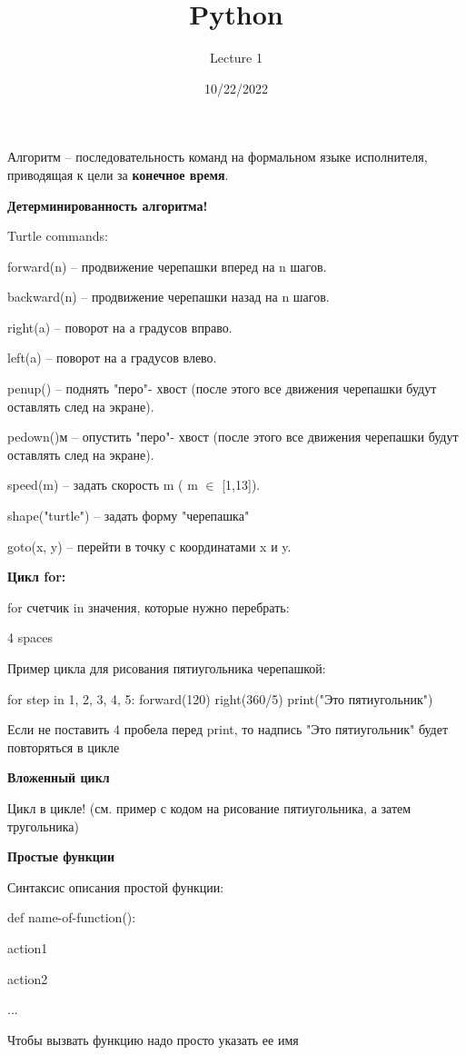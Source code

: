 \documentclass[a4paper,12pt]{article}
\author{Lecture 1}
\title{Python}
\date{10/22/2022}
\begin{document}

\maketitle
Алгоритм -- последовательность команд на формальном языке исполнителя, приводящая к цели за \textbf{конечное время}. 

\textbf{Детерминированность алгоритма!}

Turtle commands:

forward(n) -- продвижение черепашки вперед на n шагов.

backward(n) -- продвижение черепашки назад на n шагов.

right(a) -- поворот на а градусов вправо.

left(a) -- поворот на а градусов влево.

penup() -- поднять "перо"- хвост (после этого все движения черепашки будут оставлять след на экране).

pedown()м -- опустить "перо"- хвост (после этого все движения черепашки будут оставлять след на экране).

speed(m) -- задать скорость m ( m $\in$ [1,13]).

shape("turtle") -- задать форму "черепашка"

goto(x, y) --  перейти в точку с координатами x и y.

\textbf{Цикл for:}

for счетчик in значения, которые нужно перебрать:

4 spaces

Пример цикла для рисования пятиугольника черепашкой:

for step in 1, 2, 3, 4, 5:
    forward(120)
    right(360/5)
print("Это пятиугольник")

Если не поставить 4 пробела перед print, то надпись "Это пятиугольник" будет повторяться в цикле

\textbf{Вложенный цикл}

Цикл в цикле! (см. пример с кодом на рисование пятиугольника, а затем тругольника)

\textbf{Простые функции}

Синтаксис описания простой функции:

def name-of-function():
	
\> \> action1

\> \>action2

\>\>...

Чтобы вызвать функцию надо просто указать ее имя
\end{document}
